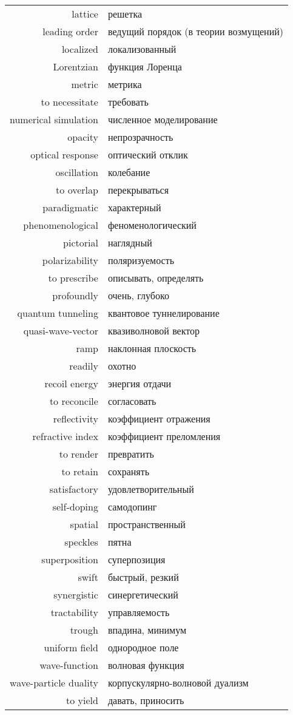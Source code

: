 \documentclass[a4paper, 14pt]{extarticle}
\begin{document}
\begin{longtable}{r@{ -- }l}
	lattice & решетка \\
	leading order & ведущий порядок (в теории возмущений) \\
	localized & локализованный \\
	Lorentzian & функция Лоренца \\
	metric & метрика \\
	to necessitate & требовать \\
	numerical simulation & численное моделирование \\
	opacity & непрозрачность \\
	optical response & оптический отклик \\
	oscillation & колебание \\
	to overlap & перекрываться \\
	paradigmatic & характерный \\
	phenomenological & феноменологический \\
	pictorial & наглядный \\
	polarizability & поляризуемость \\
	to prescribe & описывать, определять \\
	profoundly & очень, глубоко \\
	quantum tunneling & квантовое туннелирование \\
	quasi-wave-vector & квазиволновой вектор \\
	ramp & наклонная плоскость \\
	readily & охотно \\
	recoil energy & энергия отдачи \\
	to reconcile & согласовать \\
	reflectivity & коэффициент отражения \\
	refractive index & коэффициент преломления \\
	to render & превратить \\
	to retain & сохранять \\
	satisfactory & удовлетворительный \\
	self-doping & самодопинг \\
	spatial & пространственный \\
	speckles & пятна \\
	superposition & суперпозиция \\
	swift & быстрый, резкий \\
	synergistic & синергетический \\
	tractability & управляемость \\
	trough & впадина, минимум \\
	uniform field & однородное поле \\
	wave-function & волновая функция \\
	wave-particle duality & корпускулярно-волновой дуализм \\
	to yield & давать, приносить \\
\end{longtable}
\end{document}
